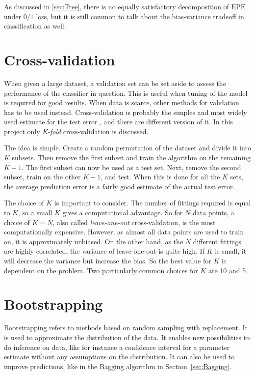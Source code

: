 As discussed in \ref{sec:Tree}, there is no equally satisfactory decomposition of $\mathrm{EPE}$ under $0/1$ loss, but it is still common to talk about the bias-variance tradeoff in classification as well.



\section{Cross-validation}
\label{sec:Cross-validation}
When given a large dataset, a validation set can be set aside to assess the performance of the classifier in question. This is useful when tuning of the model is required for good results. When data is scarce, other methods for validation has to be used instead. Cross-validation is probably the simples and most widely used estimate for the test error \citep{modstat}, and there are different version of it. In this project only \textit{K-fold} cross-validation is discussed. 

The idea is simple. Create a random permutation of the dataset and divide it into $K$ subsets. Then remove the first subset and train the algorithm on the remaining $K-1$. The first subset can now be used as a test set. Next, remove the second subset, train on the other $K-1$, and test. When this is done for all the $K$ sets, the average prediction error is a fairly good estimate of the actual test error. 

The choice of $K$ is important to consider. The number of fittings required is equal to $K$, so a small $K$ gives a computational advantage. So for $N$ data points, a choice of $K = N$, also called \textit{leave-one-out} cross-validation, is the most computationally expensive. However, as almost all data points are used to train on, it is approximately unbiased. On the other hand, as the $N$ different fittings are highly correlated, the variance of leave-one-out is quite high. If $K$ is small, it will decrease the variance but increase the bias. So the best value for $K$ is dependent on the problem. Two particularly common choices for $K$ are 10 and 5.


\section{Bootstrapping}
\label{sec:Bootstrapping}
Bootstrapping refers to methods based on random sampling with replacement. It is used to approximate the distribution of the data. It enables new possibilities to do inference on data, like for instance a confidence interval for a parameter estimate without any assumptions on the distribution. It can also be used to improve predictions, like in the Bagging algorithm in Section~\ref{sec:Bagging}. 

